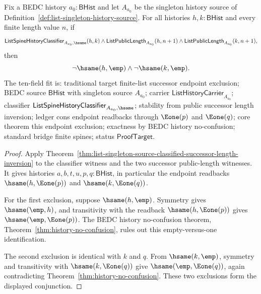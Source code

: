 \begin{theorem}
\label{thm:list-singleton-source-classified-successor-endpoint-nonempty}
Fix a BEDC history $a_0:\mathsf{BHist}$ and let $A_{a_0}$ be the singleton
history source of Definition~\ref{def:list-singleton-history-source}. For all
histories $h,k:\mathsf{BHist}$ and every finite length value $n$, if
$$
\mathsf{ListSpineHistoryClassifier}_{A_{a_0},\hsame}(h,k)\land
\mathsf{ListPublicLength}_{A_{a_0}}(h,n+1)\land
\mathsf{ListPublicLength}_{A_{a_0}}(k,n+1),
$$
then
$$
\neg\hsame(h,\emp)\land \neg\hsame(k,\emp).
$$
The ten-field fit is: traditional target finite-list successor endpoint
exclusion; BEDC source $\mathsf{BHist}$ with singleton source $A_{a_0}$;
carrier $\mathsf{ListHistoryCarrier}_{A_{a_0}}$; classifier
$\mathsf{ListSpineHistoryClassifier}_{A_{a_0},\hsame}$; stability from public
successor length inversion; ledger cons endpoint readbacks through $\Eone(p)$
and $\Eone(q)$; core theorem this endpoint exclusion; exactness by BEDC history
no-confusion; standard bridge finite spines; status $\mathsf{ProofTarget}$.
\end{theorem}
\begin{proof}
Apply
Theorem~\ref{thm:list-singleton-source-classified-successor-length-inversion} to
the classifier witness and the two successor public-length witnesses. It gives
histories $a,b,t,u,p,q:\mathsf{BHist}$, in particular the endpoint readbacks
$\hsame(h,\Eone(p))$ and $\hsame(k,\Eone(q))$.

For the first exclusion, suppose $\hsame(h,\emp)$. Symmetry gives
$\hsame(\emp,h)$, and transitivity with the readback $\hsame(h,\Eone(p))$ gives
$\hsame(\emp,\Eone(p))$. The BEDC history no-confusion theorem,
Theorem~\ref{thm:history-no-confusion}, rules out this empty-versus-one
identification.

The second exclusion is identical with $k$ and $q$. From $\hsame(k,\emp)$,
symmetry and transitivity with $\hsame(k,\Eone(q))$ give
$\hsame(\emp,\Eone(q))$, again contradicting
Theorem~\ref{thm:history-no-confusion}. These two exclusions form the displayed
conjunction.
\end{proof}

